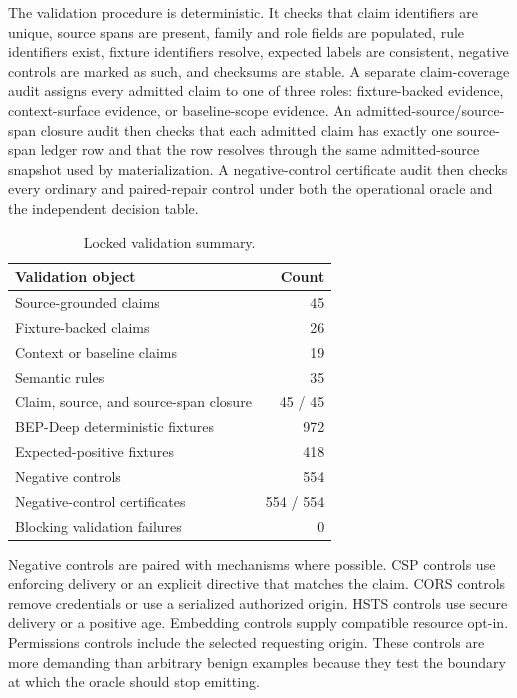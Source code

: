 \documentclass[10pt,conference]{IEEEtran}
\begin{document}
The validation procedure is deterministic. It checks that claim identifiers are unique, source spans are present, family and role fields are populated, rule identifiers exist, fixture identifiers resolve, expected labels are consistent, negative controls are marked as such, and checksums are stable.  A separate claim-coverage audit assigns every admitted claim to one of three roles: fixture-backed evidence, context-surface evidence, or baseline-scope evidence. An admitted-source/source-span closure audit then checks that each admitted claim has exactly one source-span ledger row and that the row resolves through the same admitted-source snapshot used by materialization.  A negative-control certificate audit then checks every ordinary and paired-repair control under both the operational oracle and the independent decision table.

\begin{table}[t]
\centering
\caption{Locked validation summary.}
\label{tab:supp-validation}
\begin{tabular}{lr}
\toprule
Validation object & Count \\
\midrule
Source-grounded claims & 45 \\
Fixture-backed claims & 26 \\
Context or baseline claims & 19 \\
Semantic rules & 35 \\
Claim, source, and source-span closure & 45 / 45 \\
BEP-Deep deterministic fixtures & 972 \\
Expected-positive fixtures & 418 \\
Negative controls & 554 \\
Negative-control certificates & 554 / 554 \\
Blocking validation failures & 0 \\
\bottomrule
\end{tabular}
\end{table}

Negative controls are paired with mechanisms where possible. CSP controls use enforcing delivery or an explicit directive that matches the claim. CORS controls remove credentials or use a serialized authorized origin. HSTS controls use secure delivery or a positive age. Embedding controls supply compatible resource opt-in. Permissions controls include the selected requesting origin. These controls are more demanding than arbitrary benign examples because they test the boundary at which the oracle should stop emitting.
\end{document}
